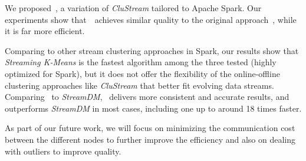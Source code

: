 We proposed~\our, a variation of \emph{CluStream} tailored to Apache Spark.
Our experiments show that~\our~achieves similar quality to the original approach~\cite{clustreamOrig}, while it is far more efficient. 

Comparing to other stream clustering approaches in Spark, our results show that \textit{Streaming K-Means} is the fastest algorithm among the three tested (highly optimized for Spark), but it does not offer the flexibility of the online-offline clustering approaches like \textit{CluStream} that better fit evolving data streams. 
Comparing \our~to \emph{StreamDM}, \our~delivers more consistent and accurate results, and outperforms \emph{StreamDM} in most cases, including one up to around 18 times faster. 

As part of our future work, we will focus on minimizing the communication cost between the different nodes to further improve the efficiency and also on dealing with outliers to improve quality.






